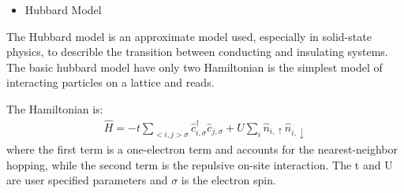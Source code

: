 \documentclass[letterpaper,10pt,english]{sphinxmanual}
\begin{document}
\begin{sphinxVerbatim}[commandchars=\\\{\}]
\PYG{p}{[}\PYG{p}{]}\PYG{p}{[}\PYG{p}{]}\PYG{p}{[}\PYG{p}{]}
\end{sphinxVerbatim}
\begin{itemize}
\item {} 
Hubbard Model

\end{itemize}

The Hubbard model is an approximate model used, especially in solid-state physics, to describle
the transition between conducting and insulating systems. The basic hubbard model have only two
Hamiltonian is the simplest model of interacting particles on a lattice and reads.

The Hamiltonian is:
\begin{equation*}
\begin{split}\hat{H}=-t\sum_{<i,j> \sigma}\hat{c}^{\dagger}_{i, \sigma}\hat{c}_{j, \sigma} +
U\sum_{i}\hat{n}_{i, \uparrow}\hat{n}_{i, \downarrow}\end{split}
\end{equation*}
where the first term is a one-electron term and accounts for the nearest-neighbor hopping, while
the second term is the repulsive on-site interaction. The t and U are user specified parameters
and \(\sigma\) is the electron spin.
\end{document}
